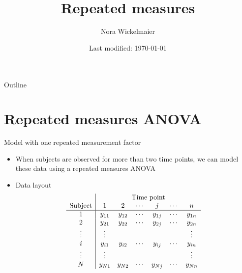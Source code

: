 \documentclass[aspectratio=169]{beamer}
\title{Repeated measures}
\author{Nora Wickelmaier}
\date{Last modified: \today}
\begin{document}
\begin{frame}{}
\thispagestyle{empty}
\titlepage
\end{frame}

\begin{frame}{Outline}
\tableofcontents
\end{frame}

\section{Repeated measures ANOVA}

\begin{frame}{Model with one repeated measurement factor}
  \begin{itemize}
    \item When subjects are observed for more than two time points, we can
      model these data using a repeated measures ANOVA
    \item Data layout
\[ \begin{array}{c|cccccc}
              & \multicolumn{6}{c}{\text{Time point}} \\
\text{Subject} & 1 & 2 & \cdots & j & \cdots & n \\ \hline
1      & y_{11} & y_{12} & \cdots & y_{1j} & \cdots & y_{1n} \\
2      & y_{21} & y_{22} & \cdots & y_{2j} & \cdots & y_{2n} \\
\vdots & \vdots &        &        &        &        & \vdots \\
i      & y_{i1} & y_{i2} & \cdots & y_{ij} & \cdots & y_{in} \\
\vdots & \vdots &        &        &        &        & \vdots \\
N      & y_{N1} & y_{N2} & \cdots & y_{Nj} & \cdots & y_{Nn} \\
\end{array} \]
  \end{itemize}
\end{frame}
\end{document}

